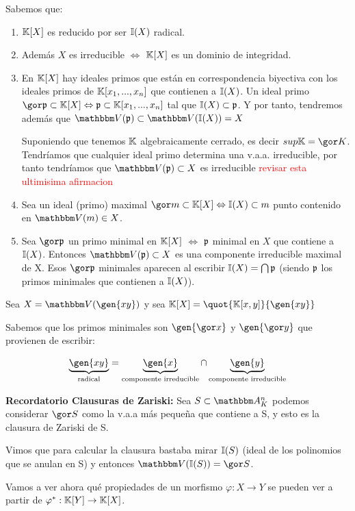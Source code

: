 Sabemos que:
\begin{enumerate}
	\item $\mathbb{K}[X]$ es reducido por ser $\mathbb{I}(X)$ radical.
	\item Además $X$ es irreducible $\Leftrightarrow$ $\mathbb{K}[X]$ es un dominio de integridad.
	\item En $\mathbb{K}[X]$ hay ideales primos que están en correspondencia biyectiva con los ideales primos de $\mathbb{K}[x_1,...,x_n]$ que contienen a $\mathbb{I}(X)$. Un ideal primo $\cls{\pideal} \subset \K[X] \Leftrightarrow \pideal \subset \K[x_1,...,x_n]$ tal que $\mathbb{I}(X) \subset \mathfrak{p}$. Y por tanto, tendremos además que  $\V(\pideal) \subset \V(\I(X))=X$

	Suponiendo que tenemos $\mathbb{K}$ algebraicamente cerrado, es decir $sup \K= \cls{K}$. Tendríamos que cualquier ideal primo determina una v.a.a. irreducible, por tanto tendríamos que $\V(\pideal)\subset X$ es irreducible \textcolor{red}{revisar esta ultimisima afirmacion}
	\item Sea un ideal (primo) maximal $\cls{m}  \subset \K[X] \Leftrightarrow \I(X) \subset m$ punto contenido en $\V(m) \in X$.
	\item Sea $\cls{\pideal}$ un primo minimal en $\mathbb{K}[X]$ $\Leftrightarrow$ $\mathfrak{p}$ minimal en $X$ que contiene a $\mathbb{I}(X)$. Entonces $\V(\pideal) \subset X$ es una componente irreducible maximal de X. Esos $\cls{\pideal}$ minimales aparecen al escribir $\mathbb{I}(X)= \bigcap \mathfrak{p}$ (siendo $\mathfrak{p}$ los primos minimales que contienen a $\mathbb{I}(X)$).
\end{enumerate}

\begin{example}
	Sea $X=\V(\gen{xy})$ y sea $\K[X]=\quot{\K[x,y]}{\gen{xy}}$

	Sabemos que los primos minimales son $\gen{\cls{x}}$ y $\gen{\cls{y}}$ que provienen de escribir:

	$$ \underbrace{\gen{xy}}_{\text{radical}} = \underbrace{\gen{x}}_{\text{componente irreducible}} \cap \underbrace{\gen{y}}_{\text{componente irreducible}}$$
\end{example}

\textbf{Recordatorio Clausuras de Zariski:} Sea $S \subset \Akn$ podemos considerar $\cls{S}$ como la v.a.a más pequeña que contiene a S, y esto es la clausura de Zariski de S.

Vimos que para calcular la clausura bastaba mirar $\mathbb{I}(S)$  (ideal de los polinomios que se anulan en S) y entonces $\V(\I(S))=\cls{S}$.

Vamos a ver ahora qué propiedades de un morfismo $\varphi: X \rightarrow Y$ se pueden ver a partir de $\varphi^*: \mathbb{K}[Y] \rightarrow \mathbb{K}[X]$.

